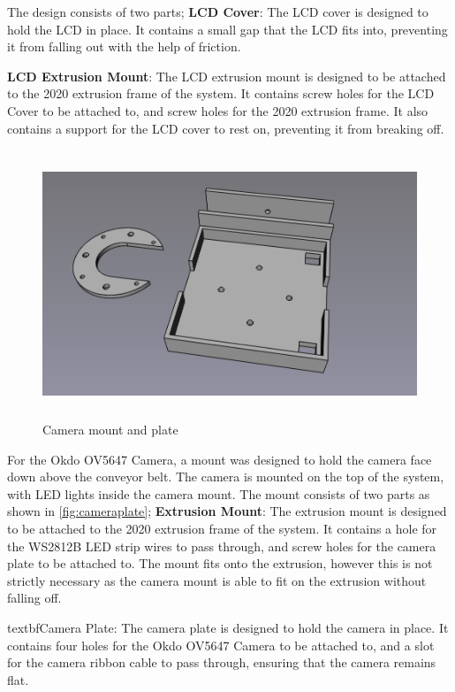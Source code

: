 The design consists of two parts;
\textbf{LCD Cover}: The LCD cover is designed to hold the LCD in place. It contains a small gap that the LCD fits into, preventing it from falling out with the help of friction.
\par
\textbf{LCD Extrusion Mount}: The LCD extrusion mount is designed to be attached to the 2020 extrusion frame of the system. It contains screw holes for the LCD Cover to be attached to, and screw holes for the 2020 extrusion frame. It also contains a support for the LCD cover to rest on, preventing it from breaking off.


\begin{figure}[H]
    \begin{minipage}[h]{0.95\textwidth}
        \centering
        \includegraphics[height=8cm]{imgs/freecad/cameraplate.jpg}
        \caption{Camera mount and plate}
        \label{fig:cameraplate}
    \end{minipage}
\end{figure}

For the Okdo OV5647 Camera, a mount was designed to hold the camera face down above the conveyor belt. The camera is mounted on the top of the system, with LED lights inside the camera mount. The mount consists of two parts as shown in \autoref{fig:cameraplate};
\textbf{Extrusion Mount}: The extrusion mount is designed to be attached to the 2020 extrusion frame of the system. It contains a hole for the WS2812B LED strip wires to pass through, and screw holes for the camera plate to be attached to. The mount fits onto the extrusion, however this is not strictly necessary as the camera mount is able to fit on the extrusion without falling off.
\par
textbf{Camera Plate}: The camera plate is designed to hold the camera in place. It contains four holes for the Okdo OV5647 Camera to be attached to, and a slot for the camera ribbon cable to pass through, ensuring that the camera remains flat.
